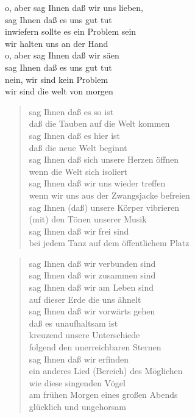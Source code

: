 \documentclass{leadsheet}
\begin{document}
\begin{song}
\begin{multicols}{2}
    \begin{chorus}[format={\itshape}]
    o, aber sag Ihnen daß wir uns lieben, \\
    sag Ihnen daß es uns gut tut \\
    inwiefern sollte es ein Problem sein \\
    wir halten uns an der Hand \\
    o, aber sag Ihnen daß wir säen \\
    sag Ihnen daß es uns gut tut \\
    nein, wir sind kein Problem \\
    wir sind die welt von morgen \\
    \end{chorus}

    \begin{verse}
    sag Ihnen daß es so ist \\
    daß die Tauben auf die Welt kommen \\
    sag Ihnen daß es hier ist \\
    daß die neue Welt beginnt \\
    sag Ihnen daß sich unsere Herzen öffnen \\
    wenn die Welt sich isoliert \\
    sag Ihnen daß wir uns wieder treffen \\
    wenn wir uns aus der Zwangsjacke befreien \\
    sag Ihnen (daß) unsere Körper vibrieren \\
    (mit) den Tönen unserer Musik \\
    sag Ihnen daß wir frei sind \\
    bei jedem Tanz auf dem öffentlichem Platz \\ 
    \end{verse}

    \begin{verse}
    sag Ihnen daß wir verbunden sind \\
    sag Ihnen daß wir zusammen sind \\
    sag Ihnen daß wir am Leben sind \\
    auf dieser Erde die uns ähnelt \\
    sag Ihnen daß wir vorwärts gehen \\
    daß es unaufhaltsam ist \\
    kreuzend unsere Unterschiede \\
    folgend den unerreichbaren Sternen \\
    sag Ihnen daß wir erfinden \\
    ein anderes Lied (Bereich) des Möglichen \\
    wie diese singenden Vögel \\
    am frühen Morgen eines großen Abends \\
    glücklich und ungehorsam \\ 
    \end{verse}
        
  \end{multicols}
\end{song}
\end{document}
